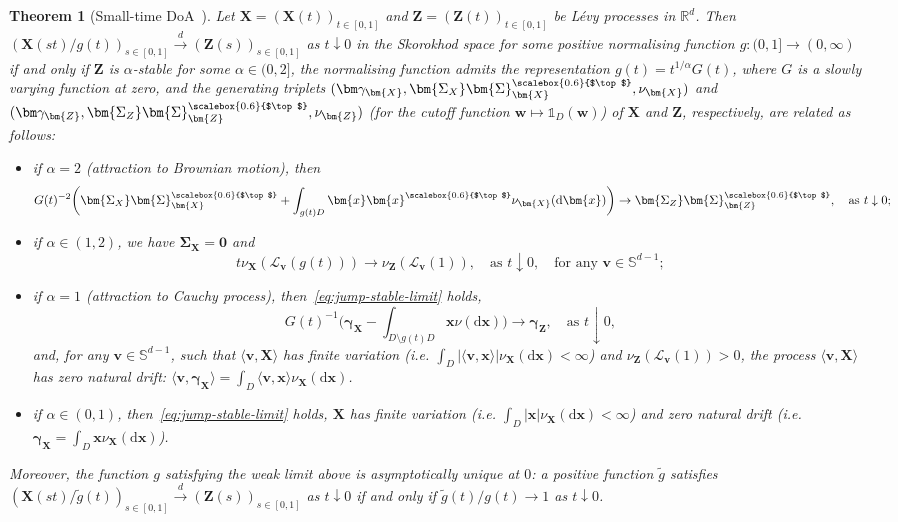 \documentclass[en,oneside,bbfont,article]{amsart}
\newtheorem{theorem}{Theorem}[section]
\theoremstyle{remark}
\theoremstyle{definition}
\theoremstyle{definition}
\newcommand\Sp{\mathbb{S}}
\newcommand\scrL{\mathscr{L}}
\newcommand\R{\mathbb{R}}
\newcommand\1{\mathds{1}}
\newcommand\da{\downarrow}
\newcommand\cid{\xrightarrow{d}}
\newcommand{\D}{\mathrm{d}}
\newcommand{\wt}[1]{\widetilde{#1}}
\newcommand{\tra}{{\scalebox{0.6}{$\top$}}}
\begin{document}
\begin{theorem}[{Small-time DoA~\cite[Thm~4.2]{WassersteinPaper}}]\label{thm:small_time_domain_stable}
Let $\bm{X}=(\bm{X}(t))_{t \in [0,1]}$ and $\bm{Z}=(\bm{Z}(t))_{t\in [0,1]}$ be L\'evy processes in $\R^d$. Then $(\bm{X}(st)/g(t))_{s \in [0,1]}\cid (\bm{Z}(s))_{s\in [0,1]}$ as $t \da 0$ in the Skorokhod space for some positive normalising function $g:(0,1]\to(0,\infty)$ if and only if $\bm{Z}$ is $\alpha$-stable for some $\alpha\in(0,2]$, the normalising function admits the representation $g(t)=t^{1/\alpha}G(t)$, where $G$ is a slowly varying function at zero, and the generating triplets $(\bm\gamma_{\bm{X}},\bm{\Sigma_X}\bm{\Sigma}_{\bm{X}}^\tra,\nu_{\bm{X}})$ and $(\bm\gamma_{\bm{Z}},\bm{\Sigma_Z}\bm{\Sigma}_{\bm{Z}}^\tra,\nu_{\bm{Z}})$ (for the cutoff function $\bm{w} \mapsto \1_{D}(\bm{w})$) of $\bm{X}$ and $\bm{Z}$, respectively, are related as follows:
\begin{itemize}[leftmargin=1em, nosep]
\item if $\alpha=2$ (attraction to Brownian motion), then 
\begin{equation}
\label{eq:Brownian-limit}
G(t)^{-2} \bigg(\bm{\Sigma_X}\bm{\Sigma}_{\bm{X}}^\tra
    +\int_{g(t)D}\bm{x}\bm{x}^\tra\nu_{\bm{X}}(\D\bm{x})\bigg)
\to
\bm{\Sigma_Z}\bm{\Sigma}_{\bm{Z}}^\tra,\quad\text{as }t\da 0;
\end{equation}
\item if $\alpha\in(1,2)$, we have $\bm{\Sigma_X}=\bm{0}$ and
\begin{equation}
\label{eq:jump-stable-limit}
t\nu_{\bm{X}}(\scrL_{\bm{v}}(g(t)))\to \nu_{\bm{Z}}(\scrL_{\bm{v}}(1)),
\quad\text{as }t\da 0,\quad\text{for any }\bm{v}\in\Sp^{d-1};
\end{equation}
    \item if $\alpha=1$ (attraction to Cauchy process), then~\eqref{eq:jump-stable-limit} holds,
\begin{equation}
\label{eq:Cauchy-limit}
G(t)^{-1}\bigg(\bm{\gamma_X} 
- \int_{D\setminus g(t)D}\bm{x}\nu(\D\bm{x})\bigg)\to \bm{\gamma_Z},
\quad\text{as }t\da 0,
\end{equation}
and, for any $\bm{v}\in\Sp^{d-1}$, such that $\langle\bm{v},\bm{X}\rangle$ has finite variation (i.e. $\int_{D}|\langle\bm{v},\bm{x}\rangle|\nu_{\bm{X}}(\D\bm{x})<\infty$) and $\nu_{\bm{Z}}(\scrL_{\bm{v}}(1))>0$, the process $\langle\bm{v},\bm{X}\rangle$ has zero natural drift: $\langle\bm{v},\bm{\gamma_X}\rangle=\int_{D}\langle\bm{v},\bm{x}\rangle\nu_{\bm{X}}(\D\bm{x})$.
\item if $\alpha\in(0,1)$, then~\eqref{eq:jump-stable-limit} holds, $\bm{X}$ has finite variation (i.e. $\int_{D}|\bm{x}|\nu_{\bm{X}}(\D\bm{x})<\infty$) and zero natural drift (i.e. $\bm{\gamma_X}=\int_{D}\bm{x}\nu_{\bm{X}}(\D\bm{x})$).
\end{itemize}
Moreover,  the function $g$ 
satisfying the weak limit above
is asymptotically unique at $0$: a positive  function $\wt g$ 
satisfies $(\bm{X}(st)/\wt g(t))_{s \in [0,1]}\cid (\bm{Z}(s))_{s\in [0,1]}$ as $t \da 0$
if and only if $\wt g(t)/g(t)\to 1$ as $t\da 0$.
\end{theorem}
\end{document}
